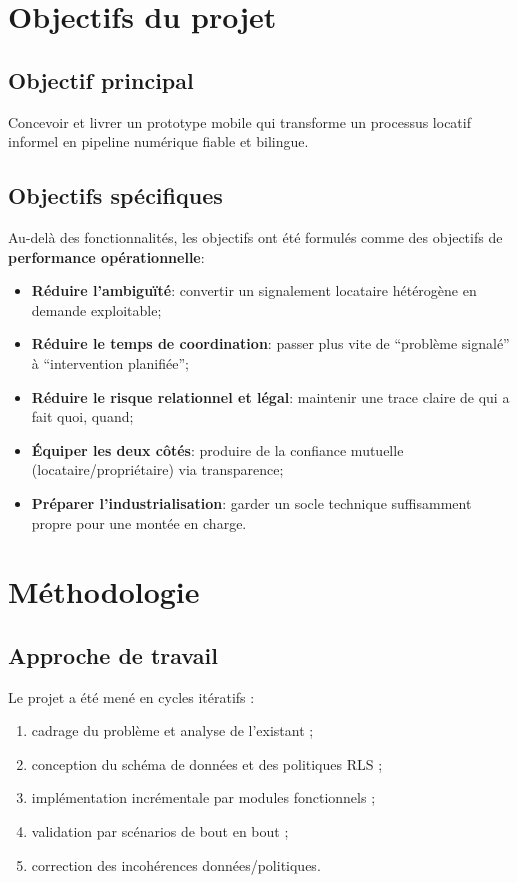 \documentclass[11pt,a4paper]{article}
\begin{document}
\section{Objectifs du projet}

\subsection{Objectif principal}

Concevoir et livrer un prototype mobile qui transforme un processus locatif informel en pipeline numérique fiable et bilingue.

\subsection{Objectifs spécifiques}

Au-delà des fonctionnalités, les objectifs ont été formulés comme des objectifs de \textbf{performance opérationnelle}:

\begin{itemize}[leftmargin=1.4em]
  \item \textbf{Réduire l'ambiguïté}: convertir un signalement locataire hétérogène en demande exploitable;
  \item \textbf{Réduire le temps de coordination}: passer plus vite de ``problème signalé'' à ``intervention planifiée'';
  \item \textbf{Réduire le risque relationnel et légal}: maintenir une trace claire de qui a fait quoi, quand;
  \item \textbf{Équiper les deux côtés}: produire de la confiance mutuelle (locataire/propriétaire) via transparence;
  \item \textbf{Préparer l'industrialisation}: garder un socle technique suffisamment propre pour une montée en charge.
\end{itemize}

\section{Méthodologie}

\subsection{Approche de travail}

Le projet a été mené en cycles itératifs :

\begin{enumerate}[leftmargin=1.4em]
  \item cadrage du problème et analyse de l'existant ;
  \item conception du schéma de données et des politiques RLS ;
  \item implémentation incrémentale par modules fonctionnels ;
  \item validation par scénarios de bout en bout ;
  \item correction des incohérences données/politiques.
\end{enumerate}
\end{document}

